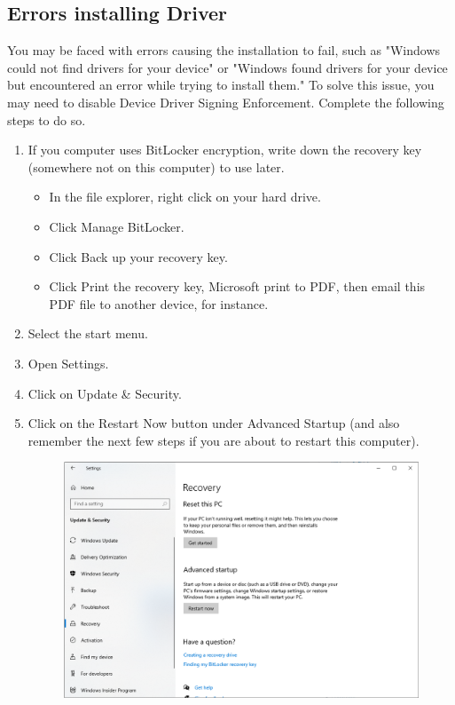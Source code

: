 \documentclass[11pt, twoside, pdftex]{article}
\begin{document}
\subsection{Errors installing Driver}

You may be faced with errors causing the installation to fail, such as "Windows could not find drivers for your device" or "Windows found drivers for your device but encountered an error while trying to install them." To solve this issue, you may need to disable Device Driver Signing Enforcement. Complete the following steps to do so.

\begin{enumerate}
  \item If you computer uses BitLocker encryption, write down the recovery key (somewhere not on this computer) to use later.
  \begin{itemize}
     \item In the file explorer, right click on your hard drive.
     \item Click Manage BitLocker.
     \item Click Back up your recovery key.
     \item Click Print the recovery key, Microsoft print to PDF, then email this PDF file to another device, for instance.
   \end{itemize}
  \item Select the start menu.
  \item Open Settings.
  \item Click on Update \& Security.
  \item Click on the Restart Now button under Advanced Startup (and also remember the next few steps if you are about to restart this computer).
  \begin{figure}[H]
	\begin{center}
		\includegraphics[scale=0.5]{figures/figure15.png}

\end{center}
\end{figure}
\end{enumerate}
\end{document}
